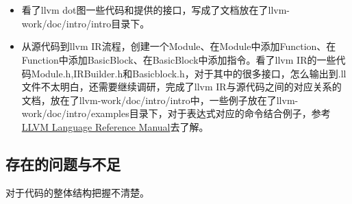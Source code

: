 \section{}
\subsection{}
\begin{itemize}
\item{看了llvm dot图一些代码和提供的接口，写成了文档放在了llvm-work/doc/intro/intro目录下。}
\item{从源代码到llvm IR流程，创建一个Module、在Module中添加Function、在Function中添加BasicBlock、在BasicBlock中添加指令。看了llvm IR的一些代码Module.h,IRBuilder.h和Basicblock.h，对于其中的很多接口，怎么输出到.ll文件不太明白，还需要继续调研，完成了llvm IR与源代码之间的对应关系的文档，放在了llvm-work/doc/intro/intro中，一些例子放在了llvm-work/doc/intro/examples目录下，对于表达式对应的命令结合例子，参考\href{http://llvm.org/docs/LangRef.html}{LLVM Language Reference Manual}去了解。}
\end{itemize}
\subsection{存在的问题与不足}
对于代码的整体结构把握不清楚。
